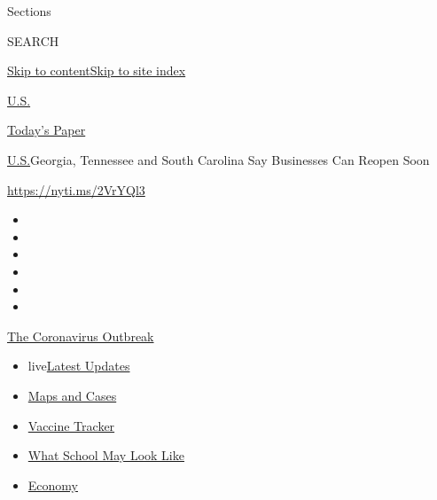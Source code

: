 Sections

SEARCH

\protect\hyperlink{site-content}{Skip to
content}\protect\hyperlink{site-index}{Skip to site index}

\href{https://www.nytimes.com/section/us}{U.S.}

\href{https://myaccount.nytimes.com/auth/login?response_type=cookie\&client_id=vi}{}

\href{https://www.nytimes.com/section/todayspaper}{Today's Paper}

\href{/section/us}{U.S.}\textbar{}Georgia, Tennessee and South Carolina
Say Businesses Can Reopen Soon

\url{https://nyti.ms/2VrYQl3}

\begin{itemize}
\item
\item
\item
\item
\item
\item
\end{itemize}

\href{https://www.nytimes.com/news-event/coronavirus?action=click\&pgtype=Article\&state=default\&region=TOP_BANNER\&context=storylines_menu}{The
Coronavirus Outbreak}

\begin{itemize}
\tightlist
\item
  live\href{https://www.nytimes.com/2020/08/01/world/coronavirus-covid-19.html?action=click\&pgtype=Article\&state=default\&region=TOP_BANNER\&context=storylines_menu}{Latest
  Updates}
\item
  \href{https://www.nytimes.com/interactive/2020/us/coronavirus-us-cases.html?action=click\&pgtype=Article\&state=default\&region=TOP_BANNER\&context=storylines_menu}{Maps
  and Cases}
\item
  \href{https://www.nytimes.com/interactive/2020/science/coronavirus-vaccine-tracker.html?action=click\&pgtype=Article\&state=default\&region=TOP_BANNER\&context=storylines_menu}{Vaccine
  Tracker}
\item
  \href{https://www.nytimes.com/interactive/2020/07/29/us/schools-reopening-coronavirus.html?action=click\&pgtype=Article\&state=default\&region=TOP_BANNER\&context=storylines_menu}{What
  School May Look Like}
\item
  \href{https://www.nytimes.com/live/2020/07/31/business/stock-market-today-coronavirus?action=click\&pgtype=Article\&state=default\&region=TOP_BANNER\&context=storylines_menu}{Economy}
\end{itemize}

